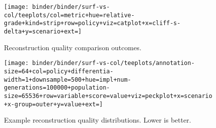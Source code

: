 \begin{figure*}
  \centering
  \begin{subfigure}[b]{0.5\textwidth}
    \centering
    \texttt{[image: binder/binder/surf-vs-col/teeplots/col=metric+hue=relative-grade+kind=strip+row=policy+viz=catplot+x=cliff-s-delta+y=scenario+ext=]}
    \caption{Reconstruction quality comparison outcomes.}
  \label{fig:col-vs-surf-overview}
  \end{subfigure}%
  \begin{subfigure}[b]{0.5\textwidth}
    \centering
    \texttt{[image: binder/binder/surf-vs-col/teeplots/annotation-size=64+col=policy+differentia-width=1+downsample=500+hue=impl+num-generations=100000+population-size=65536+row=variable+score=value+viz=peckplot+x=scenario+x-group=outer+y=value+ext=]}
    \caption{Example reconstruction quality distributions. Lower is better.}
    \label{fig:col-vs-surf-example}
  \end{subfigure}
  \caption{%
    \textbf{Does column- or surface-based instrumentation give higher-quality reconstruction?}
    \footnotesize
    Subpanel \ref{fig:col-vs-surf-overview} shows effect sizes of column-vs-surface comparisons for triplet distance and inner node loss metrics across sensitivity analysis conditions.
    Color coding indicates a significant outcome (Mann-Whitney U).
    Surface tends to outperform column under tilted policy and vice versa under steady policy.
    Subpanel \ref{fig:col-vs-surf-example} shows reconstruction quality effects for 64-bit size, bit-differentia annotations with population size 65,536, downsample size 500, and 100k generations.
    Background hatching indicates significant outcome.
    See Supplementary Figure \ref{fig:col-vs-surf} for listing of effects by sensitivity analysis condition \citep{moreno2024supplemental}.
  }
  \label{fig:col-vs-surf-summary}
\end{figure*}
